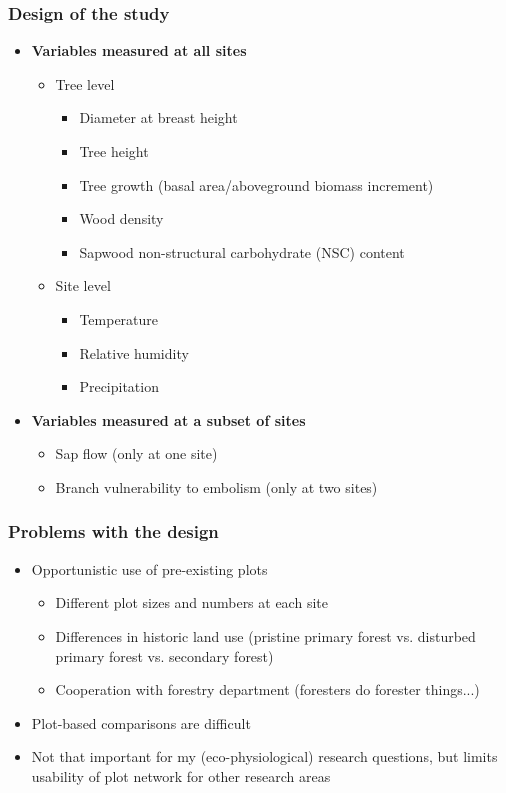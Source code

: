 \documentclass[usepdftitle=false]{beamer}
\newcommand{\Blue}[1]{{\color{blue!50!black}\textbf{#1}}}
\newcommand{\rar}{$\rightarrow$}
\newcommand{\Rar}{$\Rightarrow$}
\begin{document}
\begin{frame}
	\frametitle{Design of the study}
	\begin{itemize}
		\item \Blue{Variables measured at all sites}
		\begin{itemize}
			\item \alert<1>{Tree level}
			\begin{itemize}
				\item Diameter at breast height
				\item Tree height
				\item Tree growth (basal area/aboveground biomass increment)
				\item Wood density
				\item Sapwood non-structural carbohydrate (NSC) content
			\end{itemize}
			 \item  \alert<1>{Site level}
			  \begin{itemize}
			  	\item Temperature
			  	\item Relative humidity 
			  	\item Precipitation
			  \end{itemize}
		\end{itemize}		
		\item<2> \Blue{Variables measured at a subset of sites}
		\begin{itemize}
			\item  \alert<2>{Sap flow} (only at one site)
			\item  \alert<2>{Branch vulnerability to embolism} (only at two sites)
		\end{itemize}
	\end{itemize}
\end{frame}

\begin{frame}
	\frametitle{Problems with the design}
	\begin{itemize}
		\item<+-> \alert<1>{Opportunistic use of pre-existing plots}
		\begin{itemize}
			\item<+-| alert@+> Different plot sizes and numbers at each site
			\item<+-| alert@+> Differences in historic land use (pristine primary forest vs. disturbed primary forest vs. secondary forest)
			\item<+-| alert@+> Cooperation with forestry department (foresters do forester things...)
		\end{itemize}	
		\item<visible@+-| alert@+>[\rar] Plot-based comparisons are difficult
		\item<visible@+-| alert@+>[\Rar] Not that important for my (eco-physiological) research questions, but limits usability of plot network for other research areas
	\end{itemize}
\end{frame}
\end{document}
